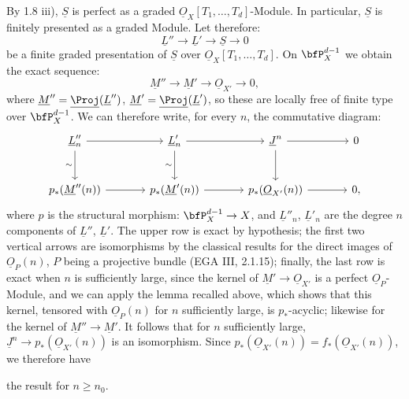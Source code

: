 By 1.8 iii), \(\underline{S}\) is perfect as a graded \(\underline{O}_X[T_1,\ldots,T_d]\)-Module. In particular, \(\underline{S}\) is finitely presented as a graded Module. Let therefore:
\[
\underline{L}''\longrightarrow \underline{L}'\longrightarrow \underline{S}\longrightarrow0
\]
be a finite graded presentation of \(\underline{S}\) over \(\underline{O}_X[T_1,\ldots,T_d]\). On \(\bfP_X^{d-1}\) we obtain the exact sequence:
\[
\underline{M}''\longrightarrow \underline{M}'\longrightarrow\underline{O}_{X'}\longrightarrow0,
\]
where \(\underline{M}''=\underline{\Proj}(\underline{L}'')\), \(\underline{M}'=\underline{\Proj}(\underline{L}')\), so these are locally free of finite type over \(\bfP_X^{d-1}\). We can therefore write, for every \(n\), the commutative diagram:
\[
\begin{tikzcd}[column sep=large,row sep=large]
\underline{L}''_n \arrow[r] \arrow[d,"\sim"'] &
\underline{L}'_n \arrow[r] \arrow[d,"\sim"'] &
\underline{J}^n \arrow[r] \arrow[d] &
0\\
p_*(\underline{M}''(n)) \arrow[r] &
p_*(\underline{M}'(n)) \arrow[r] &
p_*(\underline{O}_{X'}(n)) \arrow[r] &
0,
\end{tikzcd}
\]
where \(p\) is the structural morphism: \(\bfP_X^{d-1}\to X\), and \(\underline{L}''_n\), \(\underline{L}'_n\) are the degree \(n\) components of \(\underline{L}''\), \(\underline{L}'\). The upper row is exact by hypothesis; the first two vertical arrows are isomorphisms by the classical results for the direct images of \(\underline{O}_P(n)\), \(P\) being a projective bundle (EGA III, 2.1.15); finally, the last row is exact when \(n\) is sufficiently large, since the kernel of \(\underline{M}'\to\underline{O}_{X'}\) is a perfect \(\underline{O}_P\)-Module, and we can apply the lemma recalled above, which shows that this kernel, tensored with \(\underline{O}_P(n)\) for \(n\) sufficiently large, is \(p_*\)-acyclic; likewise for the kernel of \(\underline{M}''\to \underline{M}'\). It follows that for \(n\) sufficiently large, \(\underline{J}^n\longrightarrow p_*(\underline{O}_{X'}(n))\) is an isomorphism. Since \(p_*(\underline{O}_{X'}(n))=f_*(\underline{O}_{X'}(n))\), we therefore have

%
the result for \(n\ge n_0\).

